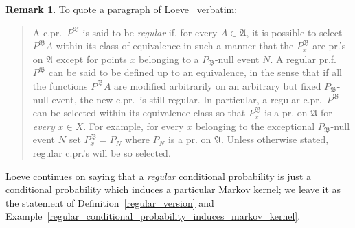 \documentclass[
twoside=true,
paper=letter,
fontsize=11pt,
pagesize=auto,
leqno,
openany,
headsepline,
overfullrule,
]{scrbook}
\theoremstyle{plain}
\theoremstyle{plain}
\theoremstyle{definition}
\newtheorem{rmk}[thm]{Remark}
\theoremstyle{bfnoteitalic}
\theoremstyle{bfnoteroman}
\newcommand{\sigalg}[1]{\mathfrak{#1}}
\newcommand{\sigmaalgebra}{\sigalg{A}}
\newcommand{\measurespace}{X}
\newcommand{\mspaceelt}{x}
\begin{document}
\begin{rmk}\label{quote_loeve}
To quote a paragraph of Loeve~\cite{pt_loeve_1960} verbatim:
\begin{quote}
A c.pr.~$P^{\sigalg{B}}$ is said to be \emph{regular} if, for every $A\in\sigmaalgebra$, it is possible to select $P^\sigalg{B} A$ within its class of equivalence in such a manner that the $P_\mspaceelt^\sigalg{B}$ are pr.'s on $\sigmaalgebra$ except for points $\mspaceelt$ belonging to a $P_\sigalg{B}$-null event $N$.
A regular pr.f.~$P^\sigalg{B}$ can be said to be defined up to an equivalence, in the sense that if all the functions $P^\sigalg{B}A$ are modified arbitrarily on an arbitrary but fixed $P_\sigalg{B}$-null event, the new c.pr.~is still regular.
In particular, a regular c.pr.~$P^\sigalg{B}$ can be selected within its equivalence class so that $P_\mspaceelt^\sigalg{B}$ is a pr. on $\sigmaalgebra$ for \emph{every} $\mspaceelt\in\measurespace$.
For example, for every $\mspaceelt$ belonging to the exceptional $P_\sigalg{B}$-null event $N$ set $P_\mspaceelt^\sigalg{B} = P_N$ where $P_N$ is a pr. on $\sigmaalgebra$.  Unless otherwise stated, regular c.pr.'s will be so selected.
\end{quote}
Loeve continues on saying that a \emph{regular} conditional probability is just a conditional probability which induces a particular Markov kernel; we leave it as the statement of Definition~\ref{regular_version} and Example~\ref{regular_conditional_probability_induces_markov_kernel}.
\end{rmk}
\end{document}
